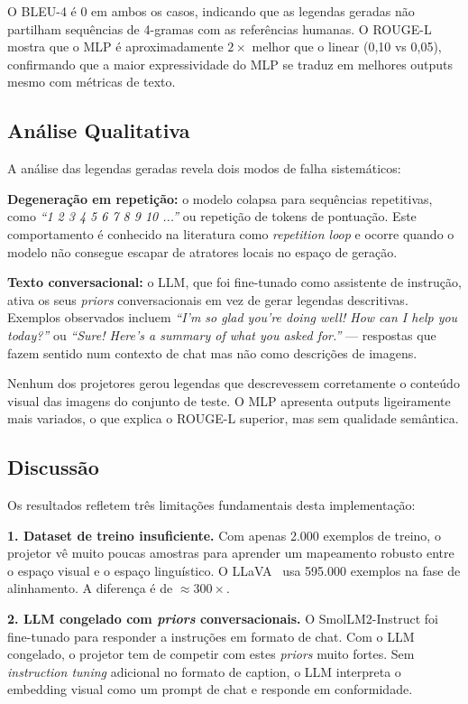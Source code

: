 \documentclass[conference]{IEEEtran}
\begin{document}
O BLEU-4 é 0 em ambos os casos, indicando que as legendas geradas não partilham sequências de 4-gramas com as referências humanas. O ROUGE-L mostra que o MLP é aproximadamente $2\times$ melhor que o linear (0,10 vs 0,05), confirmando que a maior expressividade do MLP se traduz em melhores outputs mesmo com métricas de texto.

\subsection{Análise Qualitativa}

A análise das legendas geradas revela dois modos de falha sistemáticos:

\textbf{Degeneração em repetição:} o modelo colapsa para sequências repetitivas, como \textit{``1 2 3 4 5 6 7 8 9 10 ...''} ou repetição de tokens de pontuação. Este comportamento é conhecido na literatura como \textit{repetition loop} e ocorre quando o modelo não consegue escapar de atratores locais no espaço de geração.

\textbf{Texto conversacional:} o LLM, que foi fine-tunado como assistente de instrução, ativa os seus \textit{priors} conversacionais em vez de gerar legendas descritivas. Exemplos observados incluem \textit{``I'm so glad you're doing well! How can I help you today?''} ou \textit{``Sure! Here's a summary of what you asked for.''} --- respostas que fazem sentido num contexto de chat mas não como descrições de imagens.

Nenhum dos projetores gerou legendas que descrevessem corretamente o conteúdo visual das imagens do conjunto de teste. O MLP apresenta outputs ligeiramente mais variados, o que explica o ROUGE-L superior, mas sem qualidade semântica.

\subsection{Discussão}

Os resultados refletem três limitações fundamentais desta implementação:

\textbf{1. Dataset de treino insuficiente.} Com apenas 2.000 exemplos de treino, o projetor vê muito poucas amostras para aprender um mapeamento robusto entre o espaço visual e o espaço linguístico. O LLaVA~\cite{b1} usa 595.000 exemplos na fase de alinhamento. A diferença é de $\approx300\times$.

\textbf{2. LLM congelado com \textit{priors} conversacionais.} O SmolLM2-Instruct foi fine-tunado para responder a instruções em formato de chat. Com o LLM congelado, o projetor tem de competir com estes \textit{priors} muito fortes. Sem \textit{instruction tuning} adicional no formato de caption, o LLM interpreta o embedding visual como um prompt de chat e responde em conformidade.
\end{document}
